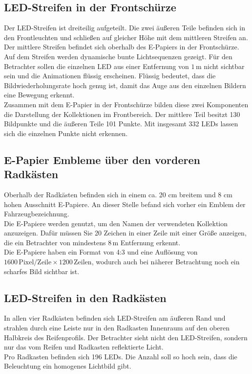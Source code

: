 \subsection{LED-Streifen in der Frontschürze}
Der LED-Streifen ist dreiteilig aufgeteilt. Die zwei äußeren Teile befinden sich in den Frontleuchten und schließen auf gleicher Höhe mit dem mittleren Streifen an. Der mittlere Streifen befindet sich oberhalb des E-Papiers in der Frontschürze. \\
Auf dem Streifen werden dynamische bunte Lichtsequenzen gezeigt. Für den Betrachter sollen die einzelnen LED aus einer Entfernung von $ 1\,\mathrm{m} $ nicht sichtbar sein und die Animationen flüssig erscheinen. Flüssig bedeutet, dass die Bildwiederholungsrate hoch genug ist, damit das Auge aus den einzelnen Bildern eine Bewegung erkennt. \\
Zusammen mit dem E-Papier in der Frontschürze bilden diese zwei
Komponenten die Darstellung der Kollektionen im Frontbereich. Der mittlere Teil besitzt 130 Bildpunkte und die äußeren Teile 101 Punkte. Mit insgesamt 332 LEDs lassen sich die einzelnen Punkte nicht erkennen.
\subsection{E-Papier Embleme über den vorderen Radkästen}
Oberhalb der Radkästen befinden sich in einem ca. 20 cm breitem und 8 cm hohen Ausschnitt E-Papiere. An dieser Stelle befand sich vorher ein Emblem der Fahrzeugbezeichnung. \\
Die E-Papiere werden genutzt, um den Namen der verwendeten Kollektion anzuzeigen. Dafür müssen Sie 20 Zeichen in einer Zeile mit einer Größe anzeigen, die ein Betrachter von mindestens $ 8\,\mathrm{m} $ Entfernung erkennt. \\
Die E-Papiere haben ein Format von 4:3 und eine Auflösung von $ 1600\,\mathrm{Pixel}/\mathrm{Zeile} \times 1200\,\mathrm{Zeilen} $, wodurch auch bei näherer Betrachtung noch ein scharfes Bild sichtbar ist.
\subsection{LED-Streifen in den Radkästen}
In allen vier Radkästen befinden sich LED-Streifen am äußeren Rand und strahlen durch eine Leiste nur in den Radkasten Innenraum auf den oberen Halbkreis des Reifenprofils. Der Betrachter sieht nicht den LED-Streifen, sondern nur das vom Reifen und Radkasten reflektierte Licht. \\
Pro Radkasten befinden sich 196 LEDs. Die Anzahl soll so hoch sein, dass die Beleuchtung ein homogenes Lichtbild gibt.
